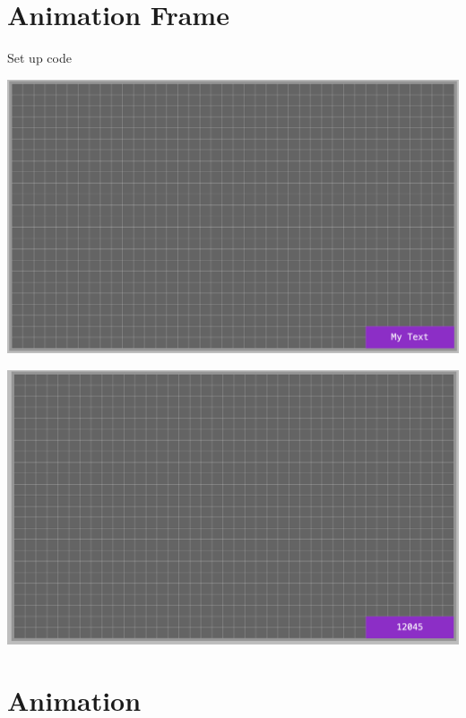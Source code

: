 \documentclass[a4paper,12pt]{article}
\begin{document}
\section{Animation Frame}
Set up code



\begin{center}
	\includegraphics[width=18cm, angle=0, origin=c]{animationframe/start_up.png}
\end{center}

\begin{center}
	\includegraphics[width=18cm, angle=0, origin=c,]{animationframe/animation_frame_running.png}
\end{center}
\newpage
\section{Animation}
\end{document}
